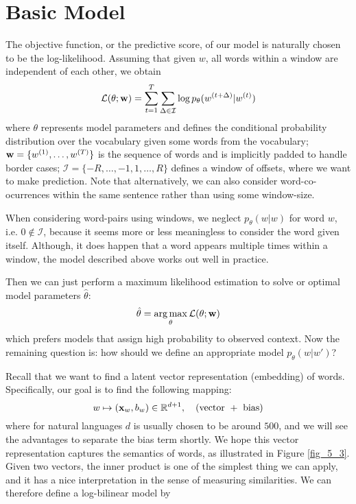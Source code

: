 \documentclass[../book-template.tex]{subfiles}
\begin{document}
\section{Basic Model}
The objective function, or the predictive score, of our model is naturally chosen to be the log-likelihood. Assuming that given $w$, all words within a window are independent of each other, we obtain
\begin{equation}\label{eq_5_log_l}
	\mathcal{L}(\theta;{\bf w})=\sum_{t=1}^{T}\sum_{\Delta \in \mathcal{I}}\log p_{\theta}(w^{(t+\Delta)}|w^{(t)})
\end{equation} 
where $\theta$ represents model parameters and defines the conditional probability distribution over the vocabulary given some words from the vocabulary; ${\bf w}=\{w^{(1)},\dots,w^{(T)}\}$ is the sequence of words and is implicitly padded to handle border cases; $\mathcal{I}=\{-R,\dots,-1,1,\dots,R\}$ defines a window of offsets, where we want to make prediction. Note that alternatively, we can also consider word-co-ocurrences within the same sentence rather than using some window-size.
\begin{remark}
	When considering word-pairs using windows, we neglect $p_{\theta}(w|w)$ for word $w$, i.e. $0\notin \mathcal{I}$, because it seems more or less meaningless to consider the word given itself. Although, it does happen that a word appears multiple times within a window, the model described above works out well in practice.
\end{remark}
\par Then we can just perform a maximum likelihood estimation to solve or optimal model parameters $\hat{\theta}$:
\begin{equation*}
	\hat{\theta} = \mathop{\arg\max}_{\theta}\mathcal{L}(\theta;{\bf w})
\end{equation*}
which prefers models that assign high probability to observed context. Now the remaining question is: how should we define an appropriate model $p_{\theta}(w|w')$? 
\par Recall that we want to find a latent vector representation (embedding) of words. Specifically, our goal is to find the following mapping:
\begin{equation*}
	w \mapsto ({\bf x}_w,b_w)\in \mathbb{R}^{d+1},\quad (\text{vector }+\text{ bias})
\end{equation*}
where for natural languages $d$ is usually chosen to be around $500$, and we will see the advantages to separate the bias term shortly. We hope this vector representation captures the semantics of words, as illustrated in Figure \ref{fig_5_3}. Given two vectors, the inner product is one of the simplest thing we can apply, and it has a nice interpretation in the sense of measuring similarities. We can therefore define a log-bilinear model by
\end{document}

